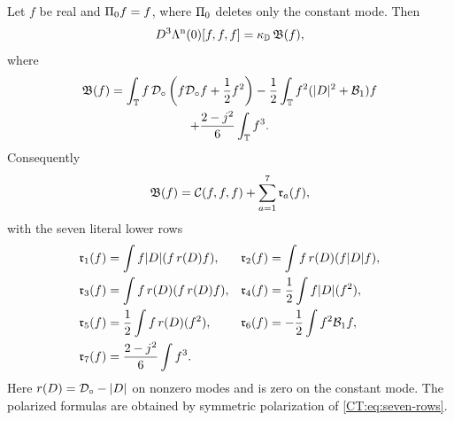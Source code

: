 \begin{proposition}
\label{CT:prop:seven-row}
Let $f$ be real and $\Pi_0 f=f$, where $\Pi_0$ deletes only the
constant mode.  Then
\begin{equation}\label{CT:eq:exact-boundary-cubic}
 D^3\Lambda^{\rm n}(0)[f,f,f]
 =\kappa_{\mathbb D}\,\mathfrak B(f),
\end{equation}
where
\begin{multline}\label{CT:eq:B-exact}
 \mathfrak B(f)
 =\int_\mathbb T f\,\mathcal D_\circ
       \left(f\mathcal D_\circ f+\frac12f^2\right)
 -\frac12\int_\mathbb T f^2(|D|^2+\mathcal B_1)f\\
 +\frac{2-j^2}{6}\int_\mathbb T f^3.
\end{multline}
Consequently
\begin{equation}\label{CT:eq:seven-row}
 \mathfrak B(f)=\mathcal C(f,f,f)+\sum_{a=1}^7\mathfrak r_a(f),
\end{equation}
with the seven literal lower rows
\begin{align}
 \mathfrak r_1(f)&=\int f|D|(f\,r(D)f),
 &\mathfrak r_2(f)&=\int f\,r(D)(f|D| f),\\
 \mathfrak r_3(f)&=\int f\,r(D)(f\,r(D)f),
 &\mathfrak r_4(f)&=\frac12\int f|D|(f^2),\\
 \mathfrak r_5(f)&=\frac12\int f\,r(D)(f^2),
 &\mathfrak r_6(f)&=-\frac12\int f^2\mathcal B_1f,
 \label{CT:eq:seven-rows}\\
 \mathfrak r_7(f)&=\frac{2-j^2}{6}\int f^3.&&
\end{align}
Here $r(D)=\mathcal D_\circ-|D|$ on nonzero modes and is zero on the
constant mode.  The polarized formulas are obtained by symmetric
polarization of \eqref{CT:eq:seven-rows}.
\end{proposition}

